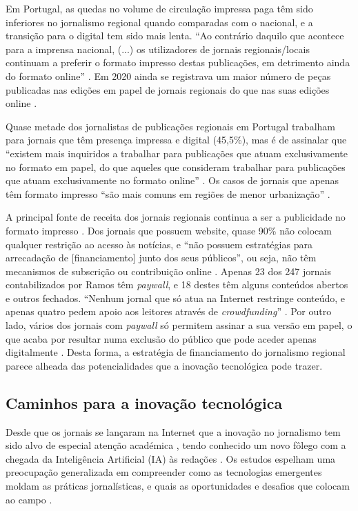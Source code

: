 \documentclass[portuguese]{textolivre}
\begin{document}
Em Portugal, as quedas no volume de circulação impressa paga têm sido
inferiores no jornalismo regional quando comparadas com o nacional, e a
transição para o digital tem sido mais lenta. ``Ao contrário daquilo que
acontece para a imprensa nacional, (...) os utilizadores de jornais
regionais/locais continuam a preferir o formato impresso destas
publicações, em detrimento ainda do formato online'' \cite[p.~10]{Cardoso2018}. Em 2020 ainda se registrava um maior número de peças
publicadas nas edições em papel de jornais regionais do que nas suas
edições online \cite{Alves2020}.

Quase metade dos jornalistas de publicações regionais em Portugal
trabalham para jornais que têm presença impressa e digital (45,5\%), mas
é de assinalar que ``existem mais inquiridos a trabalhar para
publicações que atuam exclusivamente no formato em papel, do que aqueles
que consideram trabalhar para publicações que atuam exclusivamente no
formato online'' \cite[p.~47]{Cardoso2018}. Os casos de
jornais que apenas têm formato impresso ``são mais comuns em regiões de
menor urbanização'' \cite[p.~24]{Ramos2021}.

A principal fonte de receita dos jornais regionais continua a ser a
publicidade no formato impresso \cite{Cardoso2018}. Dos
jornais que possuem website, quase 90\% não colocam qualquer restrição
ao acesso às notícias, e ``não possuem estratégias para arrecadação de
{[}financiamento{]} junto dos seus públicos'', ou seja, não têm
mecanismos de subscrição ou contribuição online
\cite[p.~25]{Ramos2021}. Apenas 23 dos 247 jornais contabilizados por
Ramos têm \emph{paywall}, e 18 destes têm alguns conteúdos abertos e
outros fechados. ``Nenhum jornal que só atua na Internet restringe
conteúdo, e apenas quatro pedem apoio aos leitores através de
\emph{crowdfunding}'' \cite[p.~26]{Ramos2021}. Por outro lado, vários
dos jornais com \emph{paywall }só permitem assinar a sua versão em
papel, o que acaba por resultar numa exclusão do público que pode aceder
apenas digitalmente \cite{Ramos2021}. Desta forma, a estratégia de
financiamento do jornalismo regional parece alheada das potencialidades
que a inovação tecnológica pode trazer.

\subsection{Caminhos para a inovação tecnológica}
Desde que os jornais se lançaram na Internet que a inovação no
jornalismo tem sido alvo de especial atenção académica \cite{GarciaAviles2021,Paulusen2016,Dogruel2013}, tendo conhecido um novo fôlego
com a chegada da Inteligência Artificial (IA) às redações \cite{Paschen2020}. Os estudos espelham uma preocupação generalizada em
compreender como as tecnologias emergentes moldam as práticas
jornalísticas, e quais as oportunidades e desafios que colocam ao campo
\cite{Goncalves2024,Canavilhas2023}.
\end{document}
